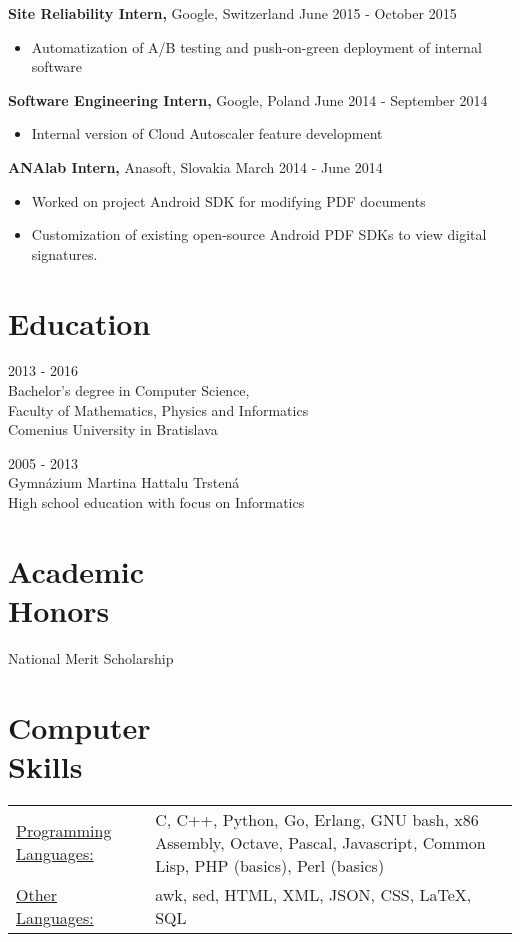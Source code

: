\documentclass[margin]{res}
\begin{document}
\begin{resume}
{\bf Site Reliability Intern,} Google, Switzerland \hfill June 2015 - October 2015
\begin{itemize} \itemsep -2pt %
\item Automatization of A/B testing and push-on-green deployment of internal software
\end{itemize}

{\bf Software Engineering Intern,} Google, Poland \hfill June 2014 - September 2014
\begin{itemize} \itemsep -2pt %
\item Internal version of Cloud Autoscaler feature development
\end{itemize}

{\bf ANAlab Intern,} Anasoft, Slovakia \hfill March 2014 - June 2014
\begin{itemize} \itemsep -2pt  %
\item Worked on project Android SDK for modifying PDF documents
\item Customization of existing open-source Android PDF SDKs to view digital signatures.
\end{itemize}


\section{Education}
2013 - 2016 \\
Bachelor's degree in Computer Science, \\ 
Faculty of Mathematics, Physics and Informatics \\
Comenius University in Bratislava

2005 - 2013 \\
Gymn\'{a}zium Martina Hattalu Trsten\'{a} \\
High school education with focus on Informatics

\section{Academic \\ Honors}
National Merit Scholarship

\section{Computer \\ Skills}
   \begin{tabular}{l p{3in}}
       \underline{Programming Languages:} & C, C++, Python, Go, Erlang, GNU bash, x86 Assembly, Octave, Pascal, Javascript, Common Lisp, PHP (basics), Perl (basics) \\
       \underline{Other Languages:} & awk, sed, HTML, XML, JSON, CSS, \LaTeX, SQL \\


\end{tabular}
\end{resume}
\end{document}

